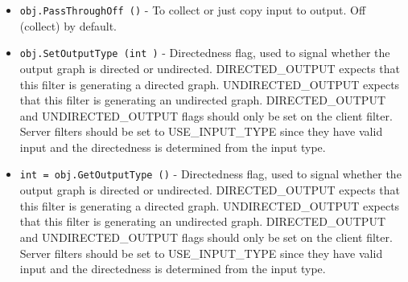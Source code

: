 \begin{itemize}
\item  \verb|obj.PassThroughOff ()| -  To collect or just copy input to output. Off (collect) by default.

\item  \verb|obj.SetOutputType (int )| -  Directedness flag, used to signal whether the output graph is directed or undirected.
 DIRECTED\_OUTPUT expects that this filter is generating a directed graph.
 UNDIRECTED\_OUTPUT expects that this filter is generating an undirected graph.
 DIRECTED\_OUTPUT and UNDIRECTED\_OUTPUT flags should only be set on the client
 filter.  Server filters should be set to USE\_INPUT\_TYPE since they have valid 
 input and the directedness is determined from the input type.

\item  \verb|int = obj.GetOutputType ()| -  Directedness flag, used to signal whether the output graph is directed or undirected.
 DIRECTED\_OUTPUT expects that this filter is generating a directed graph.
 UNDIRECTED\_OUTPUT expects that this filter is generating an undirected graph.
 DIRECTED\_OUTPUT and UNDIRECTED\_OUTPUT flags should only be set on the client
 filter.  Server filters should be set to USE\_INPUT\_TYPE since they have valid 
 input and the directedness is determined from the input type.

\end{itemize}
